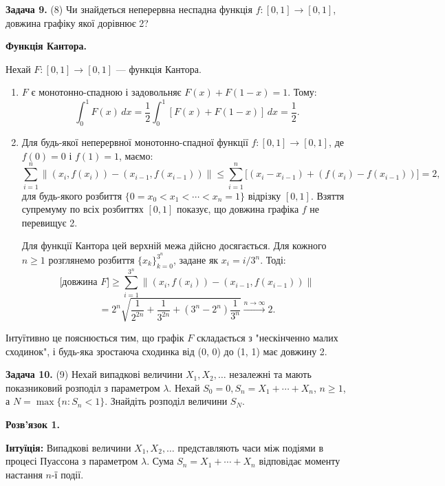 \documentclass{article}
\begin{document}
\bigskip

\noindent\textbf{Задача 9.} (8) Чи знайдеться неперервна неспадна функція \( f : [0,1] \to [0,1] \), довжина графіку якої дорівнює 2?

\textbf{Функція Кантора.}

Нехай \( F : [0, 1] \to [0, 1] \) — функція Кантора.

\begin{enumerate}
    \item \( F \) є монотонно-спадною і задовольняє \( F(x) + F(1 - x) = 1 \). Тому:
    \[
    \int_0^1 F(x) \, dx = \frac{1}{2} \int_0^1 [F(x) + F(1 - x)] \, dx = \frac{1}{2}.
    \]

    \item Для будь-якої неперервної монотонно-спадної функції \( f : [0, 1] \to [0, 1] \), де \( f(0) = 0 \) і \( f(1) = 1 \), маємо:
    \[
    \sum_{i=1}^n \lVert (x_i, f(x_i)) - (x_{i-1}, f(x_{i-1})) \rVert \leq \sum_{i=1}^n \big[(x_i - x_{i-1}) + (f(x_i) - f(x_{i-1})) \big] = 2,
    \]
    для будь-якого розбиття \( \{0 = x_0 < x_1 < \cdots < x_n = 1\} \) відрізку \([0,1]\). Взяття супремуму по всіх розбиттях \([0,1]\) показує, що довжина графіка \( f \) не перевищує 2.

    Для функції Кантора цей верхній межа дійсно досягається. Для кожного \( n \geq 1 \) розглянемо розбиття \( \{x_k\}_{k=0}^{3^n} \), задане як \( x_i = i / 3^n \). Тоді:
    \[
    \text{[довжина } F] \geq \sum_{i=1}^{3^n} \lVert (x_i, f(x_i)) - (x_{i-1}, f(x_{i-1})) \rVert
    \]
    \[
    = 2^n \sqrt{\frac{1}{2^{2n}} + \frac{1}{3^{2n}} + (3^n - 2^n)\frac{1}{3^n}} \xrightarrow{n \to \infty} 2.
    \]
\end{enumerate}

Інтуїтивно це пояснюється тим, що графік \( F \) складається з "нескінченно малих сходинок", і будь-яка зростаюча сходинка від (0, 0) до (1, 1) має довжину 2.

\bigskip

\noindent\textbf{Задача 10.} (9) Нехай випадкові величини \(X_1, X_2, \dots\) незалежні та мають показниковий розподіл з параметром \(\lambda\). Нехай \(S_0 = 0, S_n = X_1 + \cdots + X_n\), \(n \geq 1\), а \(N = \max\{n : S_n < 1\}\). Знайдіть розподіл величини \(S_N\).

\textbf{Розв’язок 1.}  

\textbf{Інтуїція:} Випадкові величини \(X_1, X_2, \dots\) представляють часи між подіями в процесі Пуассона з параметром \(\lambda\). Сума \(S_n = X_1 + \cdots + X_n\) відповідає моменту настання \(n\)-ї події.  
\end{document}
